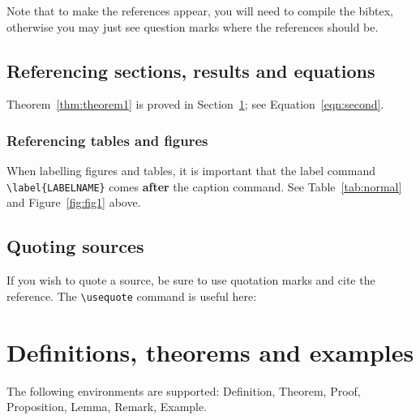 \documentclass{statsmsc}
\begin{document}
Note that to make the references appear, you will need to compile
the bibtex, otherwise you may just see question marks where the references
should be.


\subsection{Referencing sections, results and equations}

Theorem~\ref{thm:theorem1} is proved in Section~\ref{sec:defnthms}; see 
Equation~\eqref{eqn:second}.



\subsubsection{Referencing tables and figures}

When labelling figures and tables, it is important that the label command
\texttt{\textbackslash label\{LABELNAME\}} comes \textbf{after} the caption command.
See Table~\ref{tab:normal} and Figure~\ref{fig:fig1} above.

\subsection{Quoting sources}
If you wish to quote a source, be sure to use quotation marks and cite the
reference. The \texttt{\textbackslash{usequote}} command is useful here:

 \citep{dickens1859}

\clearpage


\section{Definitions, theorems and examples}
\label{sec:defnthms}

The following environments are supported:
Definition, Theorem, Proof, Proposition, Lemma, Remark, Example.
\end{document}
